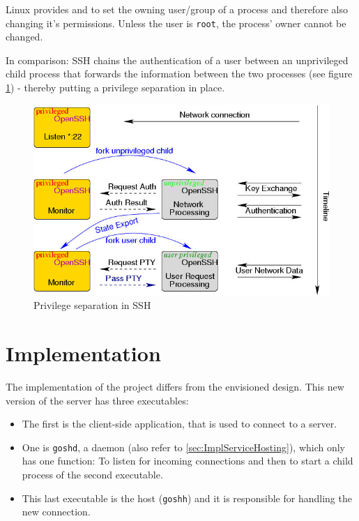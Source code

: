 \documentclass[10pt,a4paper,titlepage,twoside,english,final]{zhawreprt}
\begin{document}
\gls{Linux} provides \cite{setuid} and \cite{setgid} to set the owning user/group of a process and therefore also changing it's permissions.
Unless the user is \texttt{root}, the process' owner cannot be changed.

In comparison: \gls{SSH} chains the authentication of a user between an unprivileged child process that forwards the information between the two processes (see figure \ref{fig:PrivilegeSeparationInSSH}) - thereby putting a privilege separation in place.

\begin{figure}[ht]
\includegraphics[width=\textwidth]{priv}
\caption{Privilege separation in SSH \citep{ProvosSSHPriv}}
\label{fig:PrivilegeSeparationInSSH}
\end{figure}


\chapter{Implementation}\label{chp:Implementation}
The implementation of the project differs from the envisioned design.
This new version of the server has three executables:

\begin{itemize}
\item The first is the client-side application, that is used to connect to a server.
\item One is \texttt{goshd}, a \gls{daemon} (also refer to \ref{sec:ImplServiceHosting}), which only has one function:
To listen for incoming connections and then to start a child process of the second executable.
\item This last executable is the host (\texttt{goshh}) and it is responsible for handling the new connection.
\end{itemize}
\end{document}
